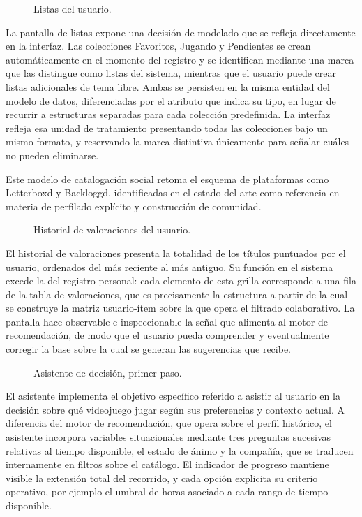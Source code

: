 \begin{figure}[ht]
	\centering
	\caption{Listas del usuario.}
	\label{fig:ui-listas}
\end{figure}

La pantalla de listas expone una decisión de modelado que se refleja directamente en la interfaz. Las colecciones Favoritos, Jugando y Pendientes se crean automáticamente en el momento del registro y se identifican mediante una marca que las distingue como listas del sistema, mientras que el usuario puede crear listas adicionales de tema libre. Ambas se persisten en la misma entidad del modelo de datos, diferenciadas por el atributo que indica su tipo, en lugar de recurrir a estructuras separadas para cada colección predefinida. La interfaz refleja esa unidad de tratamiento presentando todas las colecciones bajo un mismo formato, y reservando la marca distintiva únicamente para señalar cuáles no pueden eliminarse.

Este modelo de catalogación social retoma el esquema de plataformas como Letterboxd y Backloggd, identificadas en el estado del arte como referencia en materia de perfilado explícito y construcción de comunidad.

\begin{figure}[ht]
	\centering
	\caption{Historial de valoraciones del usuario.}
	\label{fig:ui-valoraciones}
\end{figure}

El historial de valoraciones presenta la totalidad de los títulos puntuados por el usuario, ordenados del más reciente al más antiguo. Su función en el sistema excede la del registro personal: cada elemento de esta grilla corresponde a una fila de la tabla de valoraciones, que es precisamente la estructura a partir de la cual se construye la matriz usuario-ítem sobre la que opera el filtrado colaborativo. La pantalla hace observable e inspeccionable la señal que alimenta al motor de recomendación, de modo que el usuario pueda comprender y eventualmente corregir la base sobre la cual se generan las sugerencias que recibe.

\begin{figure}[ht]
	\centering
	\caption{Asistente de decisión, primer paso.}
	\label{fig:ui-asistente}
\end{figure}

El asistente implementa el objetivo específico referido a asistir al usuario en la decisión sobre qué videojuego jugar según sus preferencias y contexto actual. A diferencia del motor de recomendación, que opera sobre el perfil histórico, el asistente incorpora variables situacionales mediante tres preguntas sucesivas relativas al tiempo disponible, el estado de ánimo y la compañía, que se traducen internamente en filtros sobre el catálogo. El indicador de progreso mantiene visible la extensión total del recorrido, y cada opción explicita su criterio operativo, por ejemplo el umbral de horas asociado a cada rango de tiempo disponible.


